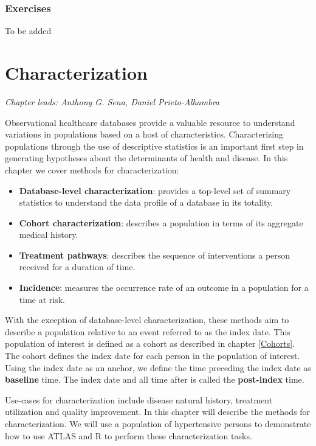 \documentclass[11pt]{book}
\providecommand{\tightlist}{%
  \setlength{\itemsep}{0pt}\setlength{\parskip}{0pt}}
\theoremstyle{definition}
\theoremstyle{definition}
\theoremstyle{definition}
\theoremstyle{remark}
\begin{document}
\hypertarget{exercises-2}{%
\subsection{Exercises}\label{exercises-2}}

To be added

\hypertarget{Characterization}{%
\chapter{Characterization}\label{Characterization}}

\emph{Chapter leads: Anthony G. Sena, Daniel Prieto-Alhambra}

Observational healthcare databases provide a valuable resource to understand variations in populations based on a host of characteristics. Characterizing populations through the use of descriptive statistics is an important first step in generating hypotheses about the determinants of health and disease. In this chapter we cover methods for characterization:

\begin{itemize}
\tightlist
\item
  \textbf{Database-level characterization}: provides a top-level set of summary statistics to understand the data profile of a database in its totality.
\item
  \textbf{Cohort characterization}: describes a population in terms of its aggregate medical history.
\item
  \textbf{Treatment pathways}: describes the sequence of interventions a person received for a duration of time.
\item
  \textbf{Incidence}: measures the occurrence rate of an outcome in a population for a time at risk.
\end{itemize}

With the exception of database-level characterization, these methods aim to describe a population relative to an event referred to as the index date. This population of interest is defined as a cohort as described in chapter \ref{Cohorts}. The cohort defines the index date for each person in the population of interest. Using the index date as an anchor, we define the time preceding the index date as \textbf{baseline} time. The index date and all time after is called the \textbf{post-index} time.

Use-cases for characterization include disease natural history, treatment utilization and quality improvement. In this chapter will describe the methods for characterization. We will use a population of hypertensive persons to demonstrate how to use ATLAS and R to perform these characterization tasks.       
\end{document}
